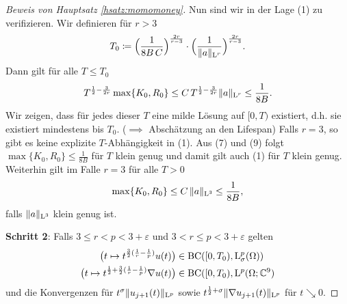 \begin{proof}[Beweis von Hauptsatz \ref{hsatz:momomoney}]
  Nun sind wir in der Lage (1) zu verifizieren.
  Wir definieren für $r > 3$
  $$
  T_0 \coloneqq \Big(\frac{1}{8 B\, C} \Big)^{\frac{2r}{r - 3}} \cdot \Big( \frac{1}{\|a\|_{\mathrm{L}^r}} \Big)^{\frac{2r}{r - 3}}.
  $$
  Dann gilt für alle $T \leq T_0$
  $$
  T^{\frac{1}{2} - \frac{3}{2r}} \max \{K_0, R_0\} \leq C\, T^{\frac{1}{2} - \frac{3}{2r}} \|a\|_{\mathrm{L}^r} \leq \frac{1}{8B}.
  $$
  Wir zeigen, dass für jedes dieser $T$ eine milde Lösung auf $[0,T)$ existiert, d.h. sie existiert mindestens bis $T_0$. ($\implies $ Abschätzung an den Lifespan)
  Falls $r = 3$, so gibt es keine explizite $T$-Abhängigkeit in (1).
  Aus (7) und (9) folgt $\max\{K_0, R_0\} \leq \frac{1}{8B}$ für $T$ klein genug und damit gilt auch (1) für $T$ klein genug.
  Weiterhin gilt im Falle $r = 3$ für alle $T > 0$
  $$
  \max\{K_0, R_0 \} \leq C\, \|a\|_{\mathrm{L}^3} \leq \frac{1}{8B},
  $$
  falls $\|a\|_{\mathrm{L}^3}$ klein genug ist.

  \textbf{Schritt 2}: Falls $3 \leq r < p < 3 + \varepsilon$ und $3 < r \leq p < 3 + \varepsilon$ gelten
  \begin{align*}
    \big( t \mapsto t^{\frac{3}{2}(\frac{1}{r} - \frac{1}{p})} u(t) \big) &\in \mathrm{BC}([0,T_0), \mathrm{L}^p_\sigma(\Omega)) \\
    \big( t \mapsto t^{\frac{1}{2} + \frac{3}{2}(\frac{1}{r} - \frac{1}{p})} \nabla u(t) \big) &\in \mathrm{BC}([0,T_0), \mathrm{L}^p(\Omega; \mathbb{C}^9) 
  \end{align*}
  und die Konvergenzen für $t^\sigma \|u_{j + 1} (t) \|_{\mathrm{L}^p}$ sowie $t^{\frac{1}{2} + \sigma} \|\nabla u_{j + 1}(t) \|_{\mathrm{L}^p}$ für $t \searrow 0$.
  

\end{proof}
